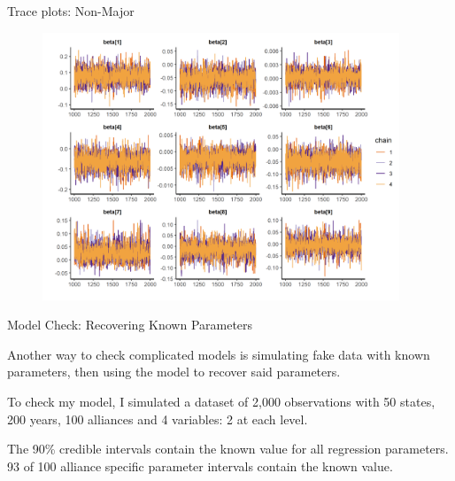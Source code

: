 \documentclass[12pt]{beamer}
\begin{document}

\begin{frame}{Trace plots: Non-Major}

\begin{figure}
	\centering
		\includegraphics[width=0.95\textwidth]{beta-trace-maj.png}
\end{figure}


\end{frame}



\begin{frame}{Model Check: Recovering Known Parameters}

Another way to check complicated models is simulating fake data with known parameters, then using the model to recover said parameters. 

To check my model, I simulated a dataset of 2,000 observations with 50 states, 200 years, 100 alliances and 4 variables: 2 at each level.

The 90\% credible intervals contain the known value for all regression parameters. 93 of 100 alliance specific parameter intervals contain the known value. 

\end{frame}


\end{document}
